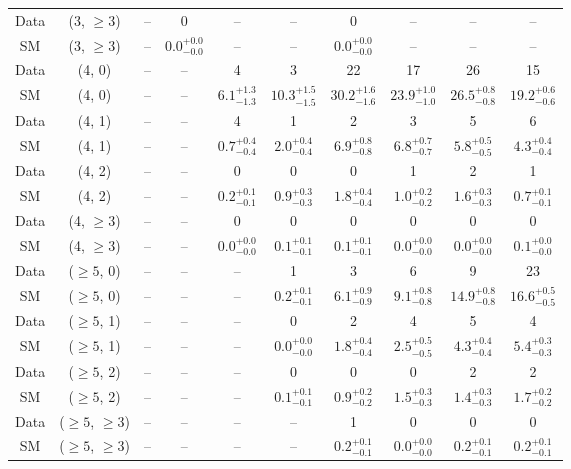 \begin{table}[h!]
{\begin{tabular}{cccccccccc}
	Data & (3, $\ge3$) & -- & 0 & -- & -- & 0 & -- & -- & -- \\[0.5ex] 
	SM & (3, $\ge3$) & -- & $0.0^{+ 0.0 }_{- 0.0 }$ & -- & -- & $0.0^{+ 0.0 }_{- 0.0 }$ & -- & -- & -- \\[0.5ex] 
	Data & (4, 0) & -- & -- & 4 & 3 & 22 & 17 & 26 & 15 \\[0.5ex] 
	SM & (4, 0) & -- & -- & $6.1^{+ 1.3 }_{- 1.3 }$ & $10.3^{+ 1.5 }_{- 1.5 }$ & $30.2^{+ 1.6 }_{- 1.6 }$ & $23.9^{+ 1.0 }_{- 1.0 }$ & $26.5^{+ 0.8 }_{- 0.8 }$ & $19.2^{+ 0.6 }_{- 0.6 }$ \\[0.5ex] 
	Data & (4, 1) & -- & -- & 4 & 1 & 2 & 3 & 5 & 6 \\[0.5ex] 
	SM & (4, 1) & -- & -- & $0.7^{+ 0.4 }_{- 0.4 }$ & $2.0^{+ 0.4 }_{- 0.4 }$ & $6.9^{+ 0.8 }_{- 0.8 }$ & $6.8^{+ 0.7 }_{- 0.7 }$ & $5.8^{+ 0.5 }_{- 0.5 }$ & $4.3^{+ 0.4 }_{- 0.4 }$ \\[0.5ex] 
	Data & (4, 2) & -- & -- & 0 & 0 & 0 & 1 & 2 & 1 \\[0.5ex] 
	SM & (4, 2) & -- & -- & $0.2^{+ 0.1 }_{- 0.1 }$ & $0.9^{+ 0.3 }_{- 0.3 }$ & $1.8^{+ 0.4 }_{- 0.4 }$ & $1.0^{+ 0.2 }_{- 0.2 }$ & $1.6^{+ 0.3 }_{- 0.3 }$ & $0.7^{+ 0.1 }_{- 0.1 }$ \\[0.5ex] 
	Data & (4, $\ge3$) & -- & -- & 0 & 0 & 0 & 0 & 0 & 0 \\[0.5ex] 
	SM & (4, $\ge3$) & -- & -- & $0.0^{+ 0.0 }_{- 0.0 }$ & $0.1^{+ 0.1 }_{- 0.1 }$ & $0.1^{+ 0.1 }_{- 0.1 }$ & $0.0^{+ 0.0 }_{- 0.0 }$ & $0.0^{+ 0.0 }_{- 0.0 }$ & $0.1^{+ 0.0 }_{- 0.0 }$ \\[0.5ex] 
	Data & ($\ge5$, 0) & -- & -- & -- & 1 & 3 & 6 & 9 & 23 \\[0.5ex] 
	SM & ($\ge5$, 0) & -- & -- & -- & $0.2^{+ 0.1 }_{- 0.1 }$ & $6.1^{+ 0.9 }_{- 0.9 }$ & $9.1^{+ 0.8 }_{- 0.8 }$ & $14.9^{+ 0.8 }_{- 0.8 }$ & $16.6^{+ 0.5 }_{- 0.5 }$ \\[0.5ex] 
	Data & ($\ge5$, 1) & -- & -- & -- & 0 & 2 & 4 & 5 & 4 \\[0.5ex] 
	SM & ($\ge5$, 1) & -- & -- & -- & $0.0^{+ 0.0 }_{- 0.0 }$ & $1.8^{+ 0.4 }_{- 0.4 }$ & $2.5^{+ 0.5 }_{- 0.5 }$ & $4.3^{+ 0.4 }_{- 0.4 }$ & $5.4^{+ 0.3 }_{- 0.3 }$ \\[0.5ex] 
	Data & ($\ge5$, 2) & -- & -- & -- & 0 & 0 & 0 & 2 & 2 \\[0.5ex] 
	SM & ($\ge5$, 2) & -- & -- & -- & $0.1^{+ 0.1 }_{- 0.1 }$ & $0.9^{+ 0.2 }_{- 0.2 }$ & $1.5^{+ 0.3 }_{- 0.3 }$ & $1.4^{+ 0.3 }_{- 0.3 }$ & $1.7^{+ 0.2 }_{- 0.2 }$ \\[0.5ex] 
	Data & ($\ge5$, $\ge3$) & -- & -- & -- & -- & 1 & 0 & 0 & 0 \\[0.5ex] 
	SM & ($\ge5$, $\ge3$) & -- & -- & -- & -- & $0.2^{+ 0.1 }_{- 0.1 }$ & $0.0^{+ 0.0 }_{- 0.0 }$ & $0.2^{+ 0.1 }_{- 0.1 }$ & $0.2^{+ 0.1 }_{- 0.1 }$ \\[0.5ex] 
	\hline
	\hline
\end{tabular}}
\end{table}
